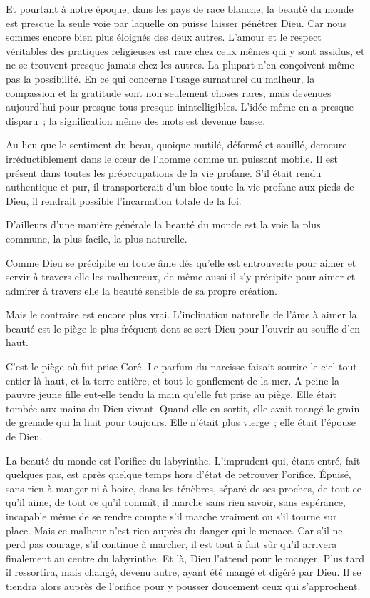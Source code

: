 \documentclass[french,twoside]{book} %
\begin{document}
Et pourtant à notre époque, dans les pays de race blanche, la beauté du monde est presque la seule voie par laquelle on puisse laisser pénétrer Dieu. Car nous sommes encore bien plus éloignés des deux autres. L'amour et le respect véritables des pratiques religieuses est rare chez ceux mêmes qui y sont assidus, et ne se trouvent presque jamais chez les autres. La plupart n'en conçoivent même pas la possibilité. En ce qui concerne l'usage surnaturel du malheur, la compassion et la gratitude sont non seulement choses rares, mais devenues aujourd'hui pour presque tous presque inintelligibles. L'idée même en a presque disparu ; la signification même des mots est devenue basse.\par
Au lieu que le sentiment du beau, quoique mutilé, déformé et souillé, demeure irréductiblement dans le cœur de l'homme comme un puissant mobile. Il est présent dans toutes les préoccupations de la vie profane. S'il était rendu authentique et pur, il transporterait d'un bloc toute la vie profane aux pieds de Dieu, il rendrait possible l'incarnation totale de la foi.\par
D'ailleurs d'une manière générale la beauté du monde est la voie la plus commune, la plus facile, la plus naturelle.\par
Comme Dieu se précipite en toute âme dés qu'elle est entrouverte pour aimer et servir à travers elle les malheureux, de même aussi il s'y précipite pour aimer et admirer à travers elle la beauté sensible de sa propre création.\par
Mais le contraire est encore plus vrai. L'inclination naturelle de l'âme à aimer la beauté est le piège le plus fréquent dont se sert Dieu pour l'ouvrir au souffle d'en haut.\par
C'est le piège où fut prise Corê. Le parfum du narcisse faisait sourire le ciel tout entier là-haut, et la terre entière, et tout le gonflement de la mer. A peine la pauvre jeune fille eut-elle tendu la main qu'elle fut prise au piège. Elle était tombée aux mains du Dieu vivant. Quand elle en sortit, elle avait mangé le grain de grenade qui la liait pour toujours. Elle n'était plus vierge ; elle était l'épouse de Dieu.\par
La beauté du monde est l'orifice du labyrinthe. L'imprudent qui, étant entré, fait quelques pas, est après quelque temps hors d'état de retrouver l'orifice. Épuisé, sans rien à manger ni à boire, dans les ténèbres, séparé de ses proches, de tout ce qu'il aime, de tout ce qu'il connaît, il marche sans rien savoir, sans espérance, incapable même de se rendre compte s'il marche vraiment ou s'il tourne sur place. Mais ce malheur n'est rien auprès du danger qui le menace. Car s'il ne perd pas courage, s'il continue à marcher, il est tout à fait sûr qu'il arrivera finalement au centre du labyrinthe. Et là, Dieu l'attend pour le manger. Plus tard il ressortira, mais changé, devenu autre, ayant été mangé et digéré par Dieu. Il se tiendra alors auprès de l'orifice pour y pousser doucement ceux qui s'approchent.\par
\end{document}
